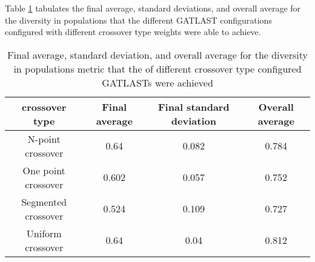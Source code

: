 Table \ref{tab:HP:GA:crossOverType:diversity in populations} tabulates the final average, standard deviations, and overall average for the diversity in populations that the different GATLAST configurations configured with different crossover type weights were able to achieve.
\begin{table}[tbh!]
\centering
\begin{adjustbox}{trim=0cm 0cm 0cm 0cm, clip=true}
\begin{tabular}{|c|c|c|c|}
\hline
crossover type & Final average & Final standard deviation & Overall average\\
\hline
N-point crossover & 0.64 & 0.082 & 0.784\\\hline
One point crossover & 0.602 & 0.057 & 0.752\\\hline
Segmented crossover & 0.524 & 0.109 & 0.727\\\hline
Uniform crossover & 0.64 & 0.04 & 0.812\\\hline
\end{tabular}
\end{adjustbox}
\caption{Final average, standard deviation, and overall average for the diversity in populations metric that the of different crossover type configured GATLASTs were achieved}
\label{tab:HP:GA:crossOverType:diversity in populations}
\end{table}